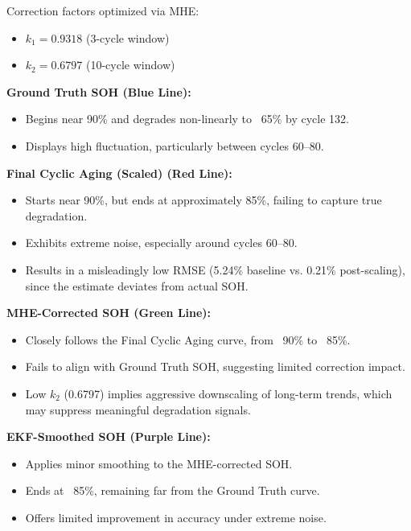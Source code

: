 Correction factors optimized via MHE:
\begin{itemize}
    \item $k_1 = 0.9318$ (3-cycle window)
    \item $k_2 = 0.6797$ (10-cycle window)
\end{itemize}

\vspace{0.5em}
\textbf{Ground Truth SOH (Blue Line):}
\begin{itemize}
    \item Begins near 90\% and degrades non-linearly to ~65\% by cycle 132.
    \item Displays high fluctuation, particularly between cycles 60--80.
\end{itemize}

\vspace{0.5em}
\textbf{Final Cyclic Aging (Scaled) (Red Line):}
\begin{itemize}
    \item Starts near 90\%, but ends at approximately 85\%, failing to capture true degradation.
    \item Exhibits extreme noise, especially around cycles 60--80.
    \item Results in a misleadingly low RMSE (5.24\% baseline vs. 0.21\% post-scaling), since the estimate deviates from actual SOH.
\end{itemize}

\vspace{0.5em}
\textbf{MHE-Corrected SOH (Green Line):}
\begin{itemize}
    \item Closely follows the Final Cyclic Aging curve, from ~90\% to ~85\%.
    \item Fails to align with Ground Truth SOH, suggesting limited correction impact.
    \item Low $k_2$ (0.6797) implies aggressive downscaling of long-term trends, which may suppress meaningful degradation signals.
\end{itemize}

\vspace{0.5em}
\textbf{EKF-Smoothed SOH (Purple Line):}
\begin{itemize}
    \item Applies minor smoothing to the MHE-corrected SOH.
    \item Ends at ~85\%, remaining far from the Ground Truth curve.
    \item Offers limited improvement in accuracy under extreme noise.
\end{itemize}

